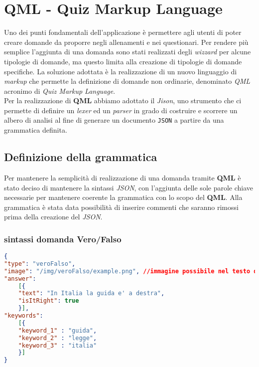 \newpage
\section{QML - Quiz Markup Language}
Uno dei punti fondamentali dell'applicazione è permettere agli utenti di poter creare domande da proporre negli allenamenti e nei questionari. Per rendere più semplice l'aggiunta di una domanda sono stati realizzati degli \textit{wizzard} per alcune tipologie di domande, ma questo limita alla creazione di tipologie di domande specifiche. La soluzione adottata è la realizzazione di un nuovo linguaggio di \textit{markup} che permette la definizione di domande non ordinarie, denominato \textit{QML} acronimo di \textit{Quiz Markup Language}. \\
Per la realizzazione di \textbf{QML} abbiamo adottato il \textit{Jison}, uno strumento che ci permette di definire un \textit{lexer} ed un \textit{parser} in grado di costruire e scorrere un albero di analisi al fine di generare un documento \texttt{JSON} a partire da una grammatica definita.

\subsection{Definizione della grammatica}
Per mantenere la semplicità di realizzazione di una domanda tramite \textbf{QML} è stato deciso di mantenere la sintassi \textit{JSON}, con l'aggiunta delle sole parole chiave necessarie per mantenere coerente la grammatica con lo scopo del \textbf{QML}. Alla grammatica è stata data possibilità di inserire commenti che saranno rimossi prima della creazione del \textit{JSON}.

\subsubsection{sintassi domanda Vero/Falso}
\begin{lstlisting}[language=json,firstnumber=1]
{	
"type": "veroFalso",
"image": "/img/veroFalso/example.png", //immagine possibile nel testo della domanda vero e falso
"answer":
	[{
	"text": "In Italia la guida e' a destra",
	"isItRight": true
	}],
"keywords":
	[{
	"keyword_1" : "guida",
	"keyword_2" : "legge",
	"keyword_3" : "italia"
	}] 
}
\end{lstlisting}

